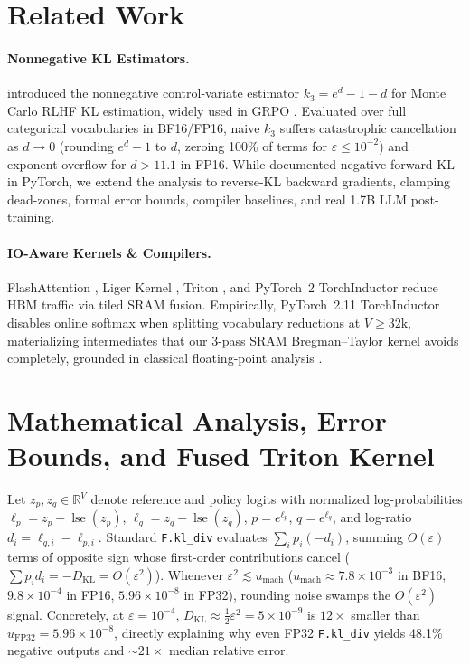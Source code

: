\documentclass[10pt]{article}
\newcommand{\KL}{D_{\mathrm{KL}}}
\begin{document}
\section{Related Work}
\paragraph{Nonnegative KL Estimators.} \citet{schulman2020kl} introduced the nonnegative control-variate estimator $k_3 = e^d - 1 - d$ for Monte Carlo RLHF KL estimation, widely used in GRPO \citep{shao2024deepseekmath}. Evaluated over full categorical vocabularies in BF16/FP16, naive $k_3$ suffers catastrophic cancellation as $d \to 0$ (rounding $e^d - 1$ to $d$, zeroing 100\% of terms for $\varepsilon \le 10^{-2}$) and exponent overflow for $d > 11.1$ in FP16. While \citet{klnegative2026} documented negative forward KL in PyTorch, we extend the analysis to reverse-KL backward gradients, clamping dead-zones, formal error bounds, compiler baselines, and real 1.7B LLM post-training.
\paragraph{IO-Aware Kernels \& Compilers.} FlashAttention \citep{dao2022flashattention}, Liger Kernel \citep{hsu2024liger}, Triton \citep{tillet2019triton}, and PyTorch~2 TorchInductor \citep{ansel2024pytorch2} reduce HBM traffic via tiled SRAM fusion. Empirically, PyTorch~2.11 TorchInductor disables online softmax when splitting vocabulary reductions at $V \ge 32\text{k}$, materializing intermediates that our 3-pass SRAM Bregman--Taylor kernel avoids completely, grounded in classical floating-point analysis \citep{higham2002accuracy}.

\section{Mathematical Analysis, Error Bounds, and Fused Triton Kernel}
Let $z_p, z_q \in \mathbb{R}^V$ denote reference and policy logits with normalized log-probabilities $\ell_p = z_p - \operatorname{lse}(z_p)$, $\ell_q = z_q - \operatorname{lse}(z_q)$, $p = e^{\ell_p}$, $q = e^{\ell_q}$, and log-ratio $d_i = \ell_{q,i} - \ell_{p,i}$. Standard \texttt{F.kl\_div} evaluates $\sum_i p_i (-d_i)$, summing $O(\varepsilon)$ terms of opposite sign whose first-order contributions cancel ($\sum p_i d_i = -\KL = O(\varepsilon^2)$). Whenever $\varepsilon^2 \lesssim u_{\mathrm{mach}}$ ($u_{\mathrm{mach}} \approx 7.8\times 10^{-3}$ in BF16, $9.8\times 10^{-4}$ in FP16, $5.96\times 10^{-8}$ in FP32), rounding noise swamps the $O(\varepsilon^2)$ signal. Concretely, at $\varepsilon=10^{-4}$, $\KL \approx \frac{1}{2}\varepsilon^2 = 5\times 10^{-9}$ is $12\times$ smaller than $u_{\mathrm{FP32}} = 5.96\times 10^{-8}$, directly explaining why even FP32 \texttt{F.kl\_div} yields 48.1\% negative outputs and $\sim 21\times$ median relative error.
\end{document}

